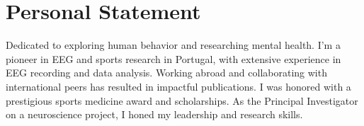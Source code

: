 \section*{Personal Statement}

\vspace{-0.5cm}


\vspace{-0.3cm}
\begin{FlushLeft}
\justifying
Dedicated to exploring human behavior and researching mental health. I'm a pioneer in EEG and sports research in Portugal, with extensive experience in EEG recording and data analysis. Working abroad and collaborating with international peers has resulted in impactful publications. I was honored with a prestigious sports medicine award and scholarships. As the Principal Investigator on a neuroscience project, I honed my leadership and research skills.
\end{FlushLeft}